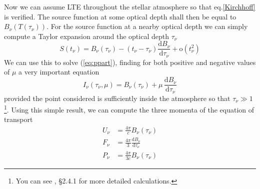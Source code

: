 \par Now we can assume LTE throughout the stellar atmosphere so that eq.\ref{Kirchhoff} is verified. The source function at some optical depth shall then be equal to $B_{\nu}(T(\tau_{\nu}))$. For the source function at a nearby optical depth we can simply compute a Taylor expansion around the optical depth $\tau_{\nu}$
\begin{equation*}
	S(t_{\nu}) = B_{\nu}(\tau_{\nu})-(t_{\nu}-\tau_{\nu})\frac{\text{d}B_{\nu}}{\text{d}\tau_{\nu}} +\text{o}(t^{2}_{\nu})
\end{equation*}
We can use this to solve (\ref{eq:ppart}), finding for both positive and negative values of $\mu$ a very important equation 
\begin{equation}
	I_{\nu}(\tau_{\nu}, \mu) = B_{\nu}(\tau_{\nu})+\mu\,\frac{\text{d}B_{\nu}}{\text{d}\tau_{\nu}}
	\label{eq:staratmo}
\end{equation}
provided the point considered is sufficiently inside the atmosphere so that $\tau_{\nu}\gg 1$\footnote{You can see \cite{choudhuri}, §2.4.1 for more detailed calculations.}. Using this simple result, we can compute the three momenta of the equation of transport
\begin{align}
	U_{\nu} &= \frac{4\pi}{c}B_{\nu}(\tau_{\nu})\\
	F_{\nu} &= \frac{4\pi}{3}\frac{\text{d}B_{\nu}}{\text{d}\tau_{\nu}}\\
	P_{\nu} &= \frac{4\pi}{3c}B_{\nu}(\tau_{\nu})
\end{align}
